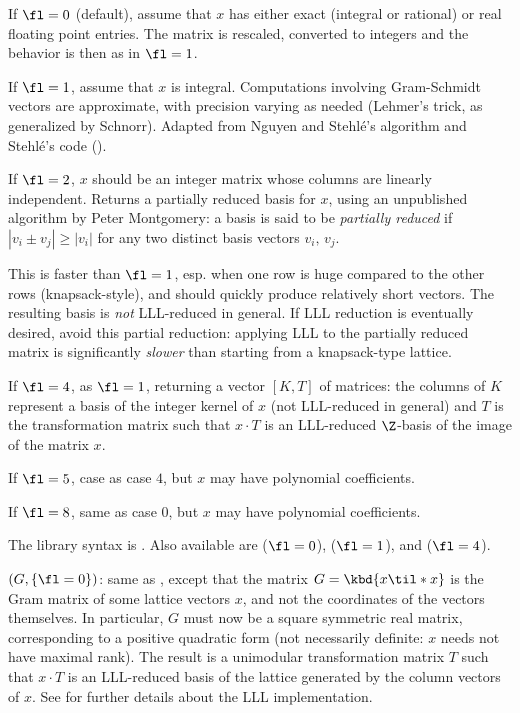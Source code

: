 If $\fl=0$ (default), assume that $x$ has either exact (integral or
rational) or real floating point entries. The matrix is rescaled, converted
to integers and the behavior is then as in $\fl = 1$.

If $\fl=1$, assume that $x$ is integral. Computations involving Gram-Schmidt
vectors are approximate, with precision varying as needed (Lehmer's trick,
as generalized by Schnorr). Adapted from Nguyen and Stehl\'e's algorithm
and Stehl\'e's code ().

If $\fl=2$, $x$ should be an integer matrix whose columns are linearly
independent. Returns a partially reduced basis for $x$, using an unpublished
algorithm by Peter Montgomery: a basis is said to be \emph{partially reduced}
if $|v_i \pm v_j| \geq |v_i|$ for any two distinct basis vectors $v_i, \,
v_j$.

This is faster than $\fl=1$, esp. when one row is huge compared
to the other rows (knapsack-style), and should quickly produce relatively
short vectors. The resulting basis is \emph{not} LLL-reduced in general.
If LLL reduction is eventually desired, avoid this partial reduction:
applying LLL to the partially reduced matrix is significantly \emph{slower}
than starting from a knapsack-type lattice.

If $\fl=4$, as $\fl=1$, returning a vector $[K, T]$ of matrices: the
columns of $K$ represent a basis of the integer kernel of $x$
(not LLL-reduced in general) and $T$ is the transformation
matrix such that $x\cdot T$ is an LLL-reduced $\Z$-basis of the image
of the matrix $x$.

If $\fl=5$, case as case $4$, but $x$ may have polynomial coefficients.

If $\fl=8$, same as case $0$, but $x$ may have polynomial coefficients.

The library syntax is .
Also available are  ($\fl=0$),
 ($\fl=1$), and  ($\fl=4$).

$(G,\{\fl=0\})$: \label{se:qflllgram}same as , except that the
matrix $G = \kbd{x\til * x}$ is the Gram matrix of some lattice vectors $x$,
and not the coordinates of the vectors themselves. In particular, $G$ must
now be a square symmetric real matrix, corresponding to a positive
quadratic form (not necessarily definite: $x$ needs not have maximal rank).
The result is a unimodular
transformation matrix $T$ such that $x \cdot T$ is an LLL-reduced basis of
the lattice generated by the column vectors of $x$. See  for
further details about the LLL implementation.


